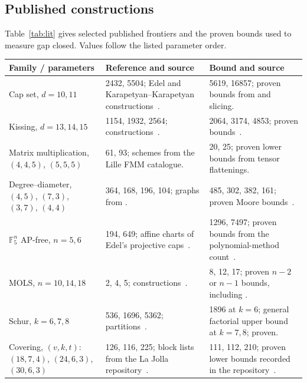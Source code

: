 \subsection{Published constructions}
Table~\ref{tab:lit} gives selected published frontiers and the proven bounds used to measure gap closed. Values follow the listed parameter order.
\begin{center}\small\setlength{\tabcolsep}{4pt}
\begin{tabularx}{\linewidth}{@{}P{.20\linewidth}YY@{}}
\toprule
Family / parameters & Reference and source & Bound and source\\
\midrule
Cap set, $d=10,11$ & 2432, 5504; Edel and Karapetyan--Karapetyan constructions~\citep{edel2004capset,karapetyan2023caps}. & 5619, 16857; proven bounds from \citet{versluis2017capset} and slicing. \\
\addlinespace
Kissing, $d=13,14,15$ & 1154, 1932, 2564; constructions~\citep{zinoviev1999contact,ganzhinov2025lines,leech1971sphere}. & 2064, 3174, 4853; proven bounds~\citep{leijenhorst2024clustered}. \\
\addlinespace
Matrix multiplication, $(4,4,5)$, $(5,5,5)$ & 61, 93; schemes from the Lille FMM catalogue. & 20, 25; proven lower bounds from tensor flattenings. \\
\addlinespace
Degree--diameter, $(4,5)$, $(7,3)$, $(3,7)$, $(4,4)$ & 364, 168, 196, 104; graphs from \citet{comellas_degdiam}. & 485, 302, 382, 161; proven Moore bounds~\citep{miller2013degdiam}. \\
\addlinespace
$\mathbb{F}_5^n$ AP-free, $n=5,6$ & 194, 649; affine charts of Edel's projective caps~\citep{edel_caps,elsholtz2020caps}. & 1296, 7497; proven bounds from the polynomial-method count~\citep{ellenberg2017capset}. \\
\addlinespace
MOLS, $n=10,14,18$ & 2, 4, 5; constructions~\citep{miller2024mols,todorov2012mols,abel2015mols}. & 8, 12, 17; proven $n-2$ or $n-1$ bounds, including \citet{lam1989order10}. \\
\addlinespace
Schur, $k=6,7,8$ & 536, 1696, 5362; partitions~\citep{fredricksen2000schur,rowley2021templates,bengone2026schur}. & 1896 at $k=6$; general factorial upper bound at $k=7,8$; proven. \\
\addlinespace
Covering, $(v,k,t)$: $(18,7,4)$, $(24,6,3)$, $(30,6,3)$ & 126, 116, 225; block lists from the La Jolla repository~\citep{ljcr}. & 111, 112, 210; proven lower bounds recorded in the repository~\citep{ljcr}. \\
\bottomrule
\end{tabularx}
\label{tab:lit}
\end{center}
\appendixpage
